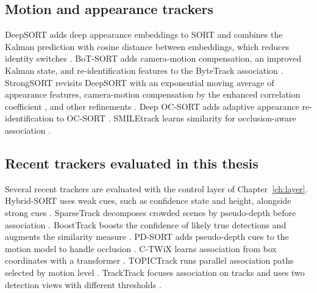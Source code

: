 \subsection{Motion and appearance trackers}
DeepSORT adds deep appearance embeddings to SORT and combines the Kalman prediction with cosine distance between embeddings, which reduces identity switches \cite{wojke2017deepsort}. BoT-SORT adds camera-motion compensation, an improved Kalman state, and re-identification features to the ByteTrack association \cite{aharon2022botsort}. StrongSORT revisits DeepSORT with an exponential moving average of appearance features, camera-motion compensation by the enhanced correlation coefficient \cite{evangelidis2008ecc}, and other refinements \cite{du2023strongsort}. Deep OC-SORT adds adaptive appearance re-identification to OC-SORT \cite{maggiolino2023deepocsort}. SMILEtrack learns similarity for occlusion-aware association \cite{wang2024smiletrack}.

\subsection{Recent trackers evaluated in this thesis}
Several recent trackers are evaluated with the control layer of Chapter~\ref{ch:layer}. Hybrid-SORT uses weak cues, such as confidence state and height, alongside strong cues \cite{yang2024hybridsort}. SparseTrack decomposes crowded scenes by pseudo-depth before association \cite{liu2025sparsetrack}. BoostTrack boosts the confidence of likely true detections and augments the similarity measure \cite{stanojevic2024boosttrack}. PD-SORT adds pseudo-depth cues to the motion model to handle occlusion \cite{wang2025pdsort}. C-TWiX learns association from box coordinates with a transformer \cite{miah2025twix}. TOPICTrack runs parallel association paths selected by motion level \cite{cao2025topictrack}. TrackTrack focuses association on tracks and uses two detection views with different thresholds \cite{shim2025tracktrack}.

